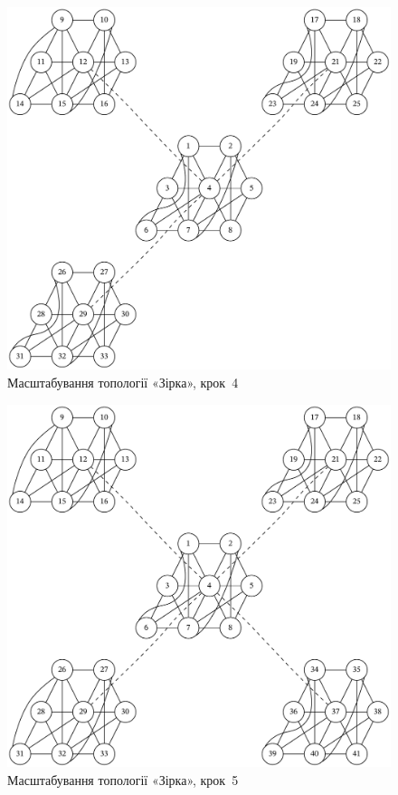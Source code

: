 \documentclass[
	a4paper,
	oneside,
	BCOR = 10mm,
	DIV = 12,
	12pt,
	headings = normal,
]{scrartcl}
\begin{document}
				\begin{figure}[!htbp]
					\centering
					\includegraphics[height=15\baselineskip]{./assets/cluster-08-03-star-s04.pdf}
					\caption{Масштабування топології «Зірка», крок~4}
					\label{fig:cluster-08-03-star-s04}
				\end{figure}

				\begin{figure}[!htbp]
					\centering
					\includegraphics[height=15\baselineskip]{./assets/cluster-08-03-star-s05.pdf}
					\caption{Масштабування топології «Зірка», крок~5}
					\label{fig:cluster-08-03-star-s05}
				\end{figure}
\end{document}
